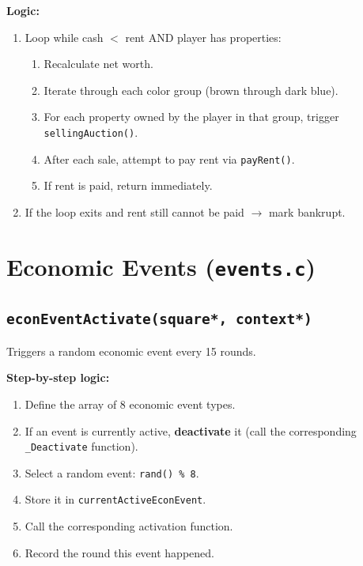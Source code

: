 \documentclass[12pt,a4paper]{article}
\begin{document}
\textbf{Logic:}
\begin{enumerate}[noitemsep]
    \item Loop while cash $<$ rent AND player has properties:
    \begin{enumerate}[noitemsep]
        \item Recalculate net worth.
        \item Iterate through each color group (brown through dark blue).
        \item For each property owned by the player in that group, trigger \texttt{sellingAuction()}.
        \item After each sale, attempt to pay rent via \texttt{payRent()}.
        \item If rent is paid, return immediately.
    \end{enumerate}
    \item If the loop exits and rent still cannot be paid $\rightarrow$ mark bankrupt.
\end{enumerate}

\newpage

\section{Economic Events (\texttt{events.c})}

\subsection{\texttt{econEventActivate(square*, context*)}}
Triggers a random economic event every 15 rounds.

\textbf{Step-by-step logic:}
\begin{enumerate}[noitemsep]
    \item Define the array of 8 economic event types.
    \item If an event is currently active, \textbf{deactivate} it (call the corresponding \texttt{\_Deactivate} function).
    \item Select a random event: \texttt{rand() \% 8}.
    \item Store it in \texttt{currentActiveEconEvent}.
    \item Call the corresponding activation function.
    \item Record the round this event happened.
\end{enumerate}
\end{document}
